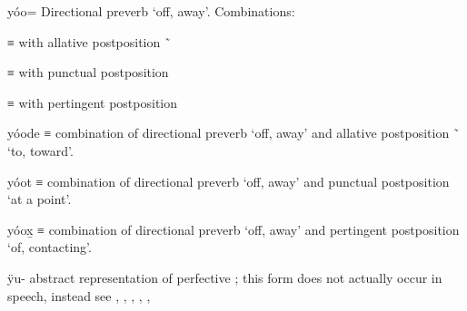 \begin{morphdesc}[resume*=alphalist]
\item[yóo=]\label{m:yóo=away}
	Directional preverb ‘off, away’.
	\newline
	Combinations:
	\begin{allolist}
	\item[\X{yóode}] ≡  with allative postposition  \~\ 
	\item[\X{yóot}]	 ≡  with punctual postposition 
	\item[\X{yóox̱}]	 ≡  with pertingent postposition 
	\end{allolist}

\item[yóode]\label{m:yóode}
	≡  combination of directional preverb  ‘off, away’
		and allative postposition  \~\  ‘to, toward’.

\item[yóot]\label{m:yóot}
	≡  combination of directional preverb  ‘off, away’
		and punctual postposition  ‘at a point’.

\item[yóox̱]\label{m:yóox̱}
	≡  combination of directional preverb  ‘off, away’
		and pertingent postposition  ‘of, contacting’.

\item[ÿu-]\label{m:ÿu-} 
	abstract representation of perfective ;
	this form does not actually occur in speech, instead see
		, , ,  , , 


\end{morphdesc}
